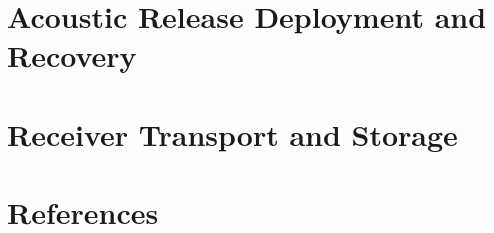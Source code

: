 \documentclass[
  letterpaper,
  DIV=11,
  numbers=noendperiod]{scrreprt}
\newlength{\cslhangindent}
\newenvironment{CSLReferences}[2] %
 {\begin{list}{}{%
  \setlength{\itemindent}{0pt}
  \setlength{\leftmargin}{0pt}
  \setlength{\parsep}{0pt}
  \ifodd #1
   \setlength{\leftmargin}{\cslhangindent}
   \setlength{\itemindent}{-1\cslhangindent}
  \fi
  \setlength{\itemsep}{#2\baselineskip}}}
 {\end{list}}
\begin{document}

\chapter{Acoustic Release Deployment and
Recovery}\label{acoustic-release-deployment-and-recovery}


\chapter{Receiver Transport and
Storage}\label{receiver-transport-and-storage}


\chapter*{References}\label{references}


\label{refs}
\begin{CSLReferences}{0}{1}
\end{CSLReferences}
\end{document}
